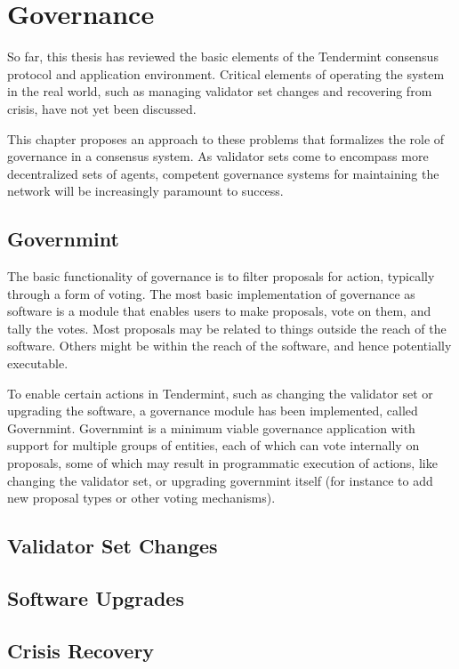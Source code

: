 \chapter{Governance}

So far, this thesis has reviewed the basic elements of the Tendermint consensus protocol and application environment.
Critical elements of operating the system in the real world, such as managing validator set changes
and recovering from crisis, have not yet been discussed. 

This chapter proposes an approach to these problems that formalizes the role of governance in a consensus system.
As validator sets come to encompass more decentralized sets of agents, competent governance systems 
for maintaining the network will be increasingly paramount to success.

\section{Governmint}

The basic functionality of governance is to filter proposals for action, typically through a form of voting.
The most basic implementation of governance as software is a module that enables users to make proposals,
vote on them, and tally the votes. Most proposals may be related to things outside the reach of the software.
Others might be within the reach of the software, and hence potentially executable.

To enable certain actions in Tendermint, such as changing the validator set or upgrading the software,
a governance module has been implemented, called Governmint.
Governmint is a minimum viable governance application with support for multiple groups of entities,
each of which can vote internally on proposals, some of which may result in programmatic execution of actions,
like changing the validator set, or upgrading governmint itself (for instance to add new proposal types or other voting mechanisms).

\section{Validator Set Changes}

\section{Software Upgrades}

\section{Crisis Recovery}
